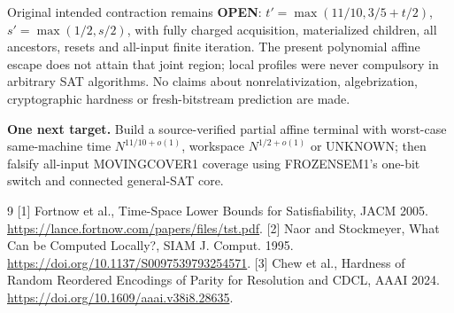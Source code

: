 \documentclass[11pt]{article}
\begin{document}
Original intended contraction remains \textbf{OPEN}: $t'=\max(11/10,3/5+t/2)$, $s'=\max(1/2,s/2)$, with fully charged acquisition, materialized children, all ancestors, resets and all-input finite iteration. The present polynomial affine escape does not attain that joint region; local profiles were never compulsory in arbitrary SAT algorithms. No claims about nonrelativization, algebrization, cryptographic hardness or fresh-bitstream prediction are made.

\noindent\textbf{One next target.} Build a source-verified partial affine terminal with worst-case same-machine time $N^{11/10+o(1)}$, workspace $N^{1/2+o(1)}$ or UNKNOWN; then falsify all-input MOVINGCOVER1 coverage using FROZENSEM1's one-bit switch and connected general-SAT core.

\begin{thebibliography}{9}
[1] Fortnow et al., Time-Space Lower Bounds for Satisfiability, JACM 2005. \url{https://lance.fortnow.com/papers/files/tst.pdf}.
[2] Naor and Stockmeyer, What Can be Computed Locally?, SIAM J. Comput. 1995. \url{https://doi.org/10.1137/S0097539793254571}.
[3] Chew et al., Hardness of Random Reordered Encodings of Parity for Resolution and CDCL, AAAI 2024. \url{https://doi.org/10.1609/aaai.v38i8.28635}.
\end{thebibliography}
\end{document}
